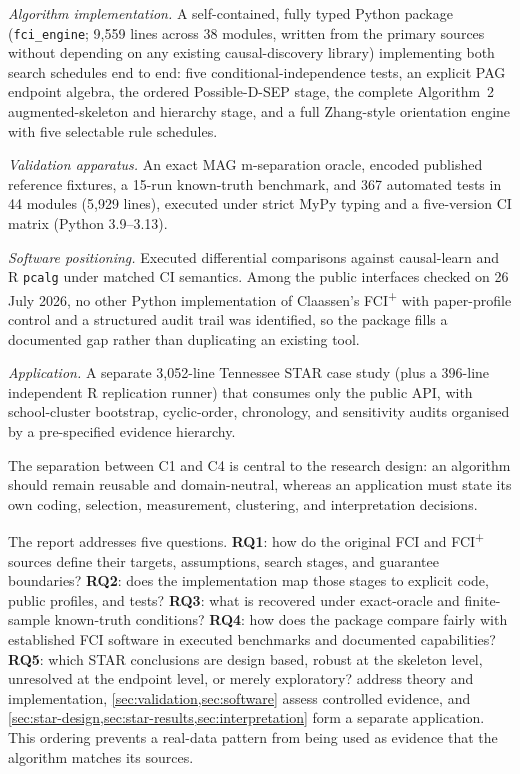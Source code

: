 \documentclass[11pt,a4paper]{article}
\newcommand{\FCIplus}{FCI\textsuperscript{+}}
\newcommand{\code}[1]{\texttt{#1}}
\begin{document}
\begin{description}[leftmargin=2.4em,itemsep=0.15em,topsep=0.2em,
  font=\normalfont\bfseries\color{ReportNavy}]
\item[C1.] \emph{Algorithm implementation.} A self-contained, fully typed
Python package (\code{fci\_engine}; 9,559 lines across 38 modules, written
from the primary sources without depending on any existing causal-discovery
library) implementing both search schedules end to end: five
conditional-independence tests, an explicit PAG endpoint algebra, the ordered
Possible-D-SEP stage, the complete Algorithm~2 augmented-skeleton and
hierarchy stage, and a full Zhang-style orientation engine with five
selectable rule schedules.
\item[C2.] \emph{Validation apparatus.} An exact MAG m-separation oracle,
encoded published reference fixtures, a 15-run known-truth benchmark, and 367
automated tests in 44 modules (5,929 lines), executed under strict MyPy typing
and a five-version CI matrix (Python 3.9--3.13).
\item[C3.] \emph{Software positioning.} Executed differential comparisons
against causal-learn and R \code{pcalg} under matched CI semantics. Among the
public interfaces checked on 26 July 2026, no other Python implementation of
Claassen's \FCIplus{} with paper-profile control and a structured audit trail
was identified, so the package fills a documented gap rather than duplicating
an existing tool.
\item[C4.] \emph{Application.} A separate 3,052-line Tennessee STAR case study
(plus a 396-line independent R replication runner) that consumes only the
public API, with school-cluster bootstrap, cyclic-order, chronology, and
sensitivity audits organised by a pre-specified evidence hierarchy.
\end{description}

The separation between C1 and C4 is central to the research design: an
algorithm should remain reusable and domain-neutral, whereas an application
must state its own coding, selection, measurement, clustering, and
interpretation decisions.

The report addresses five questions. \textbf{RQ1}: how do the original FCI and
\FCIplus{} sources define their targets, assumptions, search stages, and
guarantee boundaries? \textbf{RQ2}: does the implementation map those stages to
explicit code, public profiles, and tests? \textbf{RQ3}: what is recovered
under exact-oracle and finite-sample known-truth conditions? \textbf{RQ4}: how
does the package compare fairly with established FCI software in executed
benchmarks and documented capabilities? \textbf{RQ5}: which STAR conclusions
are design based, robust at the skeleton level, unresolved at the endpoint
level, or merely exploratory?  address
theory and implementation, \cref{sec:validation,sec:software} assess controlled
evidence, and \cref{sec:star-design,sec:star-results,sec:interpretation} form a
separate application. This ordering prevents a real-data pattern from being
used as evidence that the algorithm matches its sources.
\end{document}
